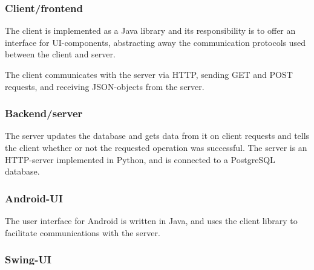 \documentclass[11pt]{article}
\begin{document}

\subsubsection{Client/frontend}
The client is implemented as a Java library and its responsibility is
to offer an interface for UI-components, abstracting away the
communication protocols used between the client and server. 

The client communicates with the server via HTTP, sending GET and POST
requests, and receiving JSON-objects from the server. 


\subsubsection{Backend/server}
The server updates the database and gets data from it on client
requests and tells the client whether or not the requested operation
was successful. The server is an HTTP-server implemented in Python, and
is connected to a PostgreSQL database.

\subsubsection{Android-UI}

The user interface for Android is written in Java, and uses the client
library to facilitate communications with the server.

\subsubsection{Swing-UI}
     
\end{document}
